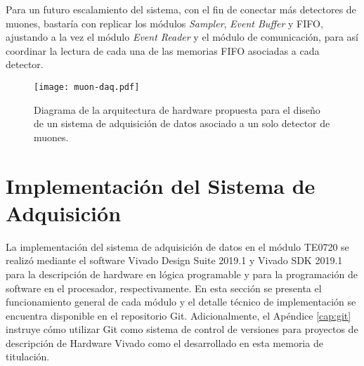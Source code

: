 		Para un futuro escalamiento del sistema, con el fin de conectar más detectores de muones, bastaría con replicar los módulos \textit{Sampler}, \textit{Event Buffer} y FIFO, ajustando a la vez el módulo \textit{Event Reader} y el módulo de comunicación, para así coordinar la lectura de cada una de las memorias FIFO asociadas a cada detector.
		
		
		\begin{figure}[H]
			\centering
			\texttt{[image: muon-daq.pdf]}
			\caption{Diagrama de la arquitectura de hardware propuesta para el diseño de un sistema de adquisición de datos asociado a un solo detector de muones.}
			\label{fig:muon-daq}
		\end{figure}
		
\section{Implementación del Sistema de Adquisición}
	La implementación del sistema de adquisición de datos en el módulo TE0720 se realizó mediante el software Vivado Design Suite 2019.1 y Vivado SDK 2019.1  para la descripción de hardware en lógica programable y  para la programación de software en el procesador, respectivamente. En esta sección se presenta el funcionamiento general de cada módulo y el detalle técnico de implementación se encuentra disponible en el repositorio Git\cite{GonzalezMuonRepository}. Adicionalmente, el Apéndice \ref{cap:git} instruye cómo utilizar Git como sistema de control de versiones para proyectos de descripción de Hardware Vivado como el desarrollado en esta memoria de titulación.
	
